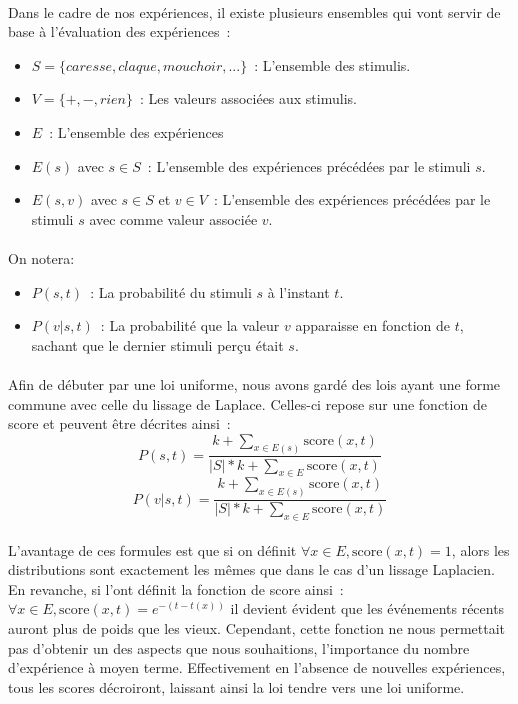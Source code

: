 \paragraph{}
Dans le cadre de nos expériences, il existe plusieurs ensembles qui vont
servir de base à l'évaluation des expériences~:
\begin{itemize}
\item $S=\{caresse, claque, mouchoir, ...\}$~: L'ensemble des stimulis.
\item $V=\{+,-,rien\}$~: Les valeurs associées aux stimulis.
\item $E$~: L'ensemble des expériences
\item $E(s)$ avec $s \in S$~: L'ensemble des expériences précédées par le
      stimuli $s$.
\item $E(s,v)$ avec $s \in S$ et $v \in V$~: L'ensemble des expériences
      précédées par le stimuli $s$ avec comme valeur associée $v$.
\end{itemize}

\paragraph{}
On notera:
\begin{itemize}
\item $P(s, t)$~: La probabilité du stimuli $s$ à l'instant $t$.
\item $P(v|s, t)$~: La probabilité que la valeur $v$ apparaisse en fonction
      de $t$, sachant que le dernier stimuli perçu était $s$.
\end{itemize}
\paragraph{}
Afin de débuter par une loi uniforme, nous avons gardé des lois ayant une
forme commune avec celle du lissage de Laplace. Celles-ci repose sur une
fonction de score et peuvent être décrites ainsi~:
$$P(s,t) = \frac{k + \sum\limits_{x \in E(s)} \mathrm{score}(x, t)}
                {|S| * k + \sum\limits_{x \in E} \mathrm{score}(x, t)}$$
$$P(v| s, t) = \frac{k + \sum\limits_{x \in E(s)} \mathrm{score}(x, t)}
                {|S| * k + \sum\limits_{x \in E} \mathrm{score}(x, t)}$$

\paragraph{}
L'avantage de ces formules est que si on définit
$\forall x \in E, \mathrm{score}(x, t) = 1$, alors les distributions sont
exactement les mêmes que dans le cas d'un lissage Laplacien. En revanche, si
l'ont définit la fonction de score ainsi~:
$\forall x \in E, \mathrm{score}(x, t) = e^{-(t - t(x))}$ il devient évident que
les événements récents auront plus de poids que les vieux. Cependant, cette
fonction ne nous permettait pas d'obtenir un des aspects que nous souhaitions,
l'importance du nombre d'expérience à moyen terme. Effectivement en l'absence
de nouvelles expériences, tous les scores décroiront, laissant ainsi la loi
tendre vers une loi uniforme.


